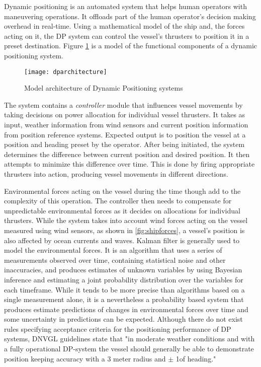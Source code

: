 

Dynamic positioning is an automated system that helps human operators with maneuvering operations. It offloads part of the human operator's decision making overhead in real-time. Using a mathematical model of the ship and, the forces acting on it, the DP system can control the vessel's thrusters to position it in a preset destination. Figure \ref{fig:dparchitecture} is a model of the functional components of a dynamic positioning system. 

\begin{figure}
	\centering
	\texttt{[image: dparchitecture]}
	\caption{Model architecture of Dynamic Positioning systems}
	\label{fig:dparchitecture}
\end{figure}


The system contains a \textit{controller} module that influences vessel movements by taking decisions on power allocation for individual vessel thrusters. It takes as input, weather information from wind sensors and current position information from position reference systems. Expected output is to position the vessel at a position and heading preset by the operator. After being initiated, the system determines the difference between current position and desired position. It then attempts to minimize this difference over time. This is done by firing appropriate thrusters into action, producing vessel movements in different directions. 

Environmental forces acting on the vessel during the time though add to the complexity of this operation. The controller then needs to compensate for unpredictable environmental forces as it decides on allocations for individual thrusters.  While the system takes into account wind forces acting on the vessel measured using wind sensors, as shown in \ref{fig:shipforces}, a vessel's position is also affected by ocean currents and waves. Kalman filter is generally used to model the environmental forces. It is an algorithm that uses a series of measurements observed over time, containing statistical noise and other inaccuracies, and produces estimates of unknown variables by using Bayesian inference and estimating a joint probability distribution over the variables for each timeframe. While it tends to be more precise than algorithms based on a single measurement alone, it is a nevertheless a probability based system that produces estimate predictions of changes in environmental forces over time and some uncertainty in predictions can be expected. Although there do not exist rules specifying acceptance criteria for the positioning performance of DP systems, DNVGL guidelines state that "in moderate weather conditions and with a fully operational DP-system the vessel should generally be able to demonstrate position keeping accuracy with a 3 meter radius and $ \pm $ 1\degree of heading." \cite{veritas2011dynamic} 

